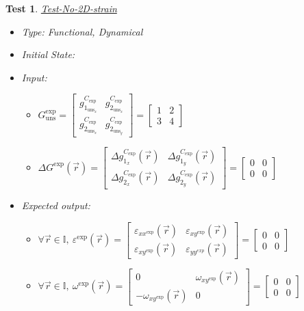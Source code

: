 \documentclass[12pt, titlepage]{article}
\newtheorem{Test}{Test}
\begin{document}
\begin{Test}\normalfont\underline{Test-No-2D-strain}
\label{T_No-2D-strain}
\begin{itemize}
\item Type: Functional, Dynamical
\item Initial State:
\item Input:
\begin{itemize}
	\item $G_{\text{uns}}^{\text{exp}} =
	\begin{bmatrix}
	g_{1_{{\text{uns}}_x}}^{C_{\text{exp}}} & g_{2_{{\text{uns}}_x}}^{C_{\text{exp}}} \\
	g_{2_{{\text{uns}}_x}}^{C_{\text{exp}}} & g_{2_{{\text{uns}}_y}}^{C_{\text{exp}}} 
	\end{bmatrix} =\begin{bmatrix}
	1 & 2 \\
	3 & 4 
	\end{bmatrix} $
	\item $\Delta G^{\text{exp}}(\vec{r})=
	\begin{bmatrix}
	\Delta g_{1_{x}}^{C_{\text{exp}}}(\vec{r}) & \Delta g_{1_{y}}^{C_{\text{exp}}}(\vec{r}) \\
	\Delta g_{2_{x}}^{C_{\text{exp}}}(\vec{r}) & \Delta g_{2_{y}}^{C_{\text{exp}}}(\vec{r})
	\end{bmatrix} = \begin{bmatrix}
	0 & 0 \\
	0 & 0 
	\end{bmatrix} $
	\end{itemize} 
\item Expected output:
	\begin{itemize}
	\item  $\forall \vec{r} \in \mathbb{I}, \ \varepsilon^{\text{exp}}(\vec{r}) = \begin{bmatrix}
	\varepsilon_{\mathit{xx}^{\text{exp}}}(\vec{r}) & \varepsilon_{\mathit{xy}^{\text{exp}}}(\vec{r}) \\
	\varepsilon_{\mathit{xy}^{\text{exp}}}(\vec{r}) & \varepsilon_{\mathit{yy^{\text{exp}}}}(\vec{r})
	\end{bmatrix} = \begin{bmatrix}
	0 & 0 \\
	0 & 0 
	\end{bmatrix} $
	\item $\forall \vec{r} \in \mathbb{I}, \  \omega^{\text{exp}}(\vec{r}) = \begin{bmatrix}
	0 & \omega_{\mathit{xy}^{\text{exp}}}(\vec{r}) \\
	-\omega_{\mathit{xy}^{\text{exp}}}(\vec{r}) & 0 
	\end{bmatrix} = \begin{bmatrix}
	0 & 0 \\
	0 & 0 
	\end{bmatrix} $
	\end{itemize}
\end{itemize}
\end{Test}
\end{document}
